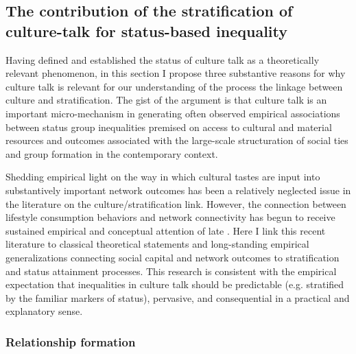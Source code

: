\subsection{The contribution of the stratification of culture-talk for status-based inequality}  
\label{sec:inequality}

Having defined and established the status of culture talk as a theoretically relevant phenomenon, in this section I propose three substantive reasons for why culture talk is relevant for our understanding of the process the linkage between culture and stratification.  The gist of the argument is that culture talk is an important micro-mechanism in generating often observed empirical associations between status group inequalities premised on access to cultural and material resources and outcomes associated with the large-scale structuration of social ties and group formation in the contemporary context.  

Shedding empirical light on the way in which cultural tastes are input into substantively important network outcomes has been a relatively neglected issue in the literature on the culture/stratification link.  However, the connection between lifestyle consumption behaviors and network connectivity has begun to receive sustained empirical and conceptual attention of late \citep{erickson96, lizardo06a, wimmer_lewis10}.   Here I link this recent literature to classical theoretical statements and long-standing empirical generalizations connecting social capital and network outcomes to stratification and status attainment processes.  This research is consistent with the empirical expectation that inequalities in culture talk should be predictable (e.g. stratified by the familiar markers of status), pervasive, and consequential in a practical and explanatory sense.

\subsubsection{Relationship formation}
\label{subsubsec:relform}

